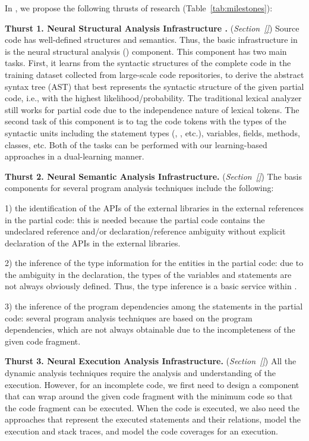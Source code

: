 In {\tool}, we propose the following thrusts of research
(Table~\ref{tab:milestones}):

\vspace{3pt}
\noindent \textbf{Thurst 1. Neural Structural Analysis Infrastructure
  .} ({\em Section~\ref{}}) Source code has
well-defined structures and semantics. Thus, the basic infrastructure
in {\tool} is the neural structural analysis ()
component.  This component has two main tasks. First, it learns from
the syntactic structures of the complete code in the training dataset
collected from large-scale code repositories, to derive the abstract
syntax tree (AST) that best represents the syntactic structure of the
given partial code, i.e., with the highest likelihood/probability.
The traditional lexical analyzer still works for partial code due to
the independence nature of lexical tokens. The second task of this
component is to tag the code tokens with the types of the syntactic
units including the statement types (, , etc.),
variables, fields, methods, classes, etc. Both of the tasks can be
performed with our learning-based approaches in a dual-learning
manner.
  
\vspace{3pt}
\noindent \textbf{Thurst 2. Neural Semantic Analysis Infrastructure.}
({\em Section~\ref{}}) The basis components for several program
analysis techniques include the following:

1) the identification of the APIs of the external libraries in the
external references in the partial code: this is needed because the
partial code contains the undeclared reference and/or
declaration/reference ambiguity without explicit declaration of the
APIs in the external libraries.

2) the inference of the type information for the entities in the
partial code: due to the ambiguity in the declaration, the types of
the variables and statements are not always obviously defined. Thus,
the type inference is a basic service within {\tool}.

3) the inference of the program dependencies among the statements in
the partial code: several program analysis techniques are based on the
program dependencies, which are not always obtainable due to the
incompleteness of the given code fragment.

\vspace{3pt}
\noindent \textbf{Thurst 3. Neural Execution Analysis Infrastructure.}
({\em Section~\ref{}}) All the dynamic analysis techniques require the
analysis and understanding of the execution. However, for an
incomplete code, we first need to design a component that can wrap
around the given code fragment with the minimum code so that the code
fragment can be executed. When the code is executed, we also need the
approaches that represent the executed statements and their relations,
model the execution and stack traces, and model the code coverages
for an execution.

